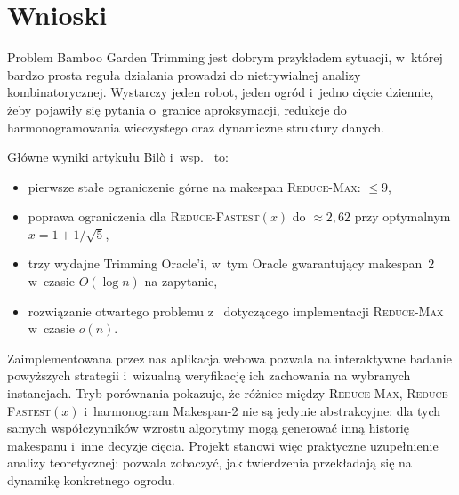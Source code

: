 \documentclass[12pt,a4paper]{article}
\theoremstyle{plain}
\theoremstyle{definition}
\theoremstyle{remark}
\newcommand{\RF}{\textsc{Reduce-Fastest}}
\newcommand{\RM}{\textsc{Reduce-Max}}
\begin{document}
\section{Wnioski}

Problem Bamboo Garden Trimming jest dobrym przykładem sytuacji, w~której
bardzo prosta reguła działania prowadzi do nietrywialnej analizy
kombinatorycznej. Wystarczy jeden robot, jeden ogród i~jedno cięcie dziennie,
żeby pojawiły się pytania o~granice aproksymacji, redukcje do harmonogramowania
wieczystego oraz dynamiczne struktury danych.

Główne wyniki artykułu Bilò i~wsp.~\cite{bilo2022} to:

\begin{itemize}[noitemsep]
  \item pierwsze stałe ograniczenie górne na makespan \RM{}: $\leq 9$,
  \item poprawa ograniczenia dla \RF$(x)$ do $\approx 2{,}62$
        przy optymalnym $x = 1 + 1/\sqrt{5}$,
  \item trzy wydajne Trimming Oracle'i, w~tym Oracle gwarantujący
        makespan~$2$ w~czasie $O(\log n)$ na zapytanie,
  \item rozwiązanie otwartego problemu z~\cite{gasieniec2017}
        dotyczącego implementacji \RM{} w~czasie $o(n)$.
\end{itemize}

Zaimplementowana przez nas aplikacja webowa pozwala na interaktywne
badanie powyższych strategii i~wizualną weryfikację ich zachowania
na wybranych instancjach. Tryb porównania pokazuje, że różnice między
\RM{}, \RF$(x)$ i~harmonogram Makespan-2 nie są jedynie abstrakcyjne: dla tych samych
współczynników wzrostu algorytmy mogą generować inną historię makespanu
i~inne decyzje cięcia. Projekt stanowi więc praktyczne uzupełnienie analizy
teoretycznej: pozwala zobaczyć, jak twierdzenia przekładają się na dynamikę
konkretnego ogrodu.
\end{document}
